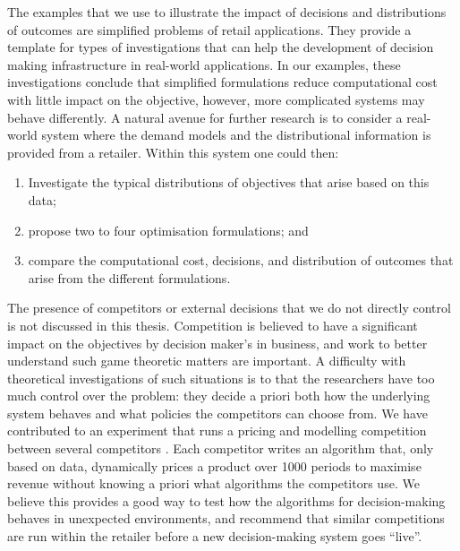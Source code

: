 \documentclass[main.tex]{subfiles}
\begin{document}
The examples that we use to illustrate the impact of decisions and
distributions of outcomes are simplified problems of retail
applications. They provide a template for types of investigations that
can help the development of decision making infrastructure in
real-world applications.  In our examples, these investigations
conclude that simplified formulations reduce computational cost with
little impact on the objective, however, more complicated systems may
behave differently.  A natural avenue for further research is to
consider a real-world system where the demand models and the
distributional information is provided from a retailer. Within this
system one could then:
\begin{enumerate}
\item Investigate the typical distributions of objectives that arise
  based on this data;
\item propose two to four optimisation formulations; and
\item compare the computational cost, decisions, and distribution of
  outcomes that arise from the different formulations.
\end{enumerate}

The presence of competitors or external decisions that we do not
directly control is not discussed in this thesis. Competition is
believed to have a significant impact on the objectives by decision
maker's in business, and work to better understand such game theoretic
matters are important. A difficulty with theoretical investigations of
such situations is to that the researchers have too much control over
the problem: they decide a priori both how the underlying system
behaves and what policies the competitors can choose from.  We have
contributed to an experiment that runs a pricing and modelling
competition between several competitors \citep{geer2018dynamic}.  Each
competitor writes an algorithm that, only based on data, dynamically
prices a product over \num{1000} periods to maximise revenue without
knowing a priori what algorithms the competitors use. We believe this
provides a good way to test how the algorithms for decision-making
behaves in unexpected environments, and recommend that similar
competitions are run within the retailer before a new decision-making
system goes ``live''.



\biblio{} %
\end{document}
